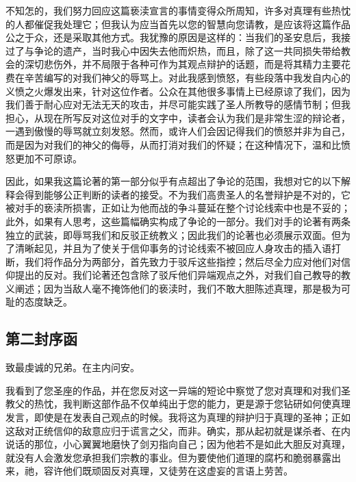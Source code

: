 不知怎的，我们努力回应这篇亵渎宣言的事情变得众所周知，许多对真理有些热忱的人都催促我处理它；但我认为应当首先以您的智慧向您请教，是应该将这篇作品公之于众，还是采取其他方式。我犹豫的原因是这样的：当我们的圣安息后，我接过了与争论的遗产，当时我心中因失去他而炽热，而且，除了这一共同损失带给教会的深切悲伤外，并不局限于各种可作为其观点辩护的话题，而是将其精力主要花费在辛苦编写的对我们神父的辱骂上。对此我感到愤怒，有些段落中我发自内心的义愤之火爆发出来，针对这位作者。公众在其他很多事情上已经原谅了我们，因为我们善于耐心应对无法无天的攻击，并尽可能实践了圣人所教导的感情节制；但我担心，从现在所写反对这位对手的文字中，读者会认为我们是非常生涩的辩论者，一遇到傲慢的辱骂就立刻发怒。然而，或许人们会因记得我们的愤怒并非为自己，而是因为对我们的神父的侮辱，从而打消对我们的怀疑；在这种情况下，温和比愤怒更加不可原谅。\par

因此，如果我这篇论著的第一部分似乎有点超出了争论的范围，我想对它的以下解释会得到能够公正判断的读者的接受。不为我们高贵圣人的名誉辩护是不对的，它被对手的亵渎所损害，正如让为他而战的争斗蔓延在整个讨论线索中也是不妥的；此外，如果有人思考，这些篇幅确实构成了争论的一部分。我们对手的论著有两条独立的武装，即辱骂我们和反驳正统教义；因此我们的论著也必须展示双面。但为了清晰起见，并且为了使关于信仰事务的讨论线索不被回应人身攻击的插入语打断，我们将作品分为两部分，首先致力于驳斥这些指控；然后尽全力应对他们对信仰提出的反对。我们论著还包含除了驳斥他们异端观点之外，对我们自己教导的教义阐述；因为当敌人毫不掩饰他们的亵渎时，我们不敢大胆陈述真理，那是极为可耻的态度缺乏。\par


\subsection{第二封序函}

致最虔诚的兄弟。在主内问安。\par

我看到了您圣座的作品，并在您反对这一异端的短论中察觉了您对真理和对我们圣教父的热忱，我判断这部作品不仅单纯出于您的能力，更是源于您钻研如何使真理发言，即使是在发表自己观点的时候。我将这为真理的辩护归于真理的圣神；正如这敌对正统信仰的敌意应归于谎言之父，而非。确实，那从起初就是谋杀者、在内说话的那位，小心翼翼地磨快了剑刃指向自己；因为他若不是如此大胆反对真理，就没有人会激发您承担我们宗教的事业。但为要使他们道理的腐朽和脆弱暴露出来，祂，容许他们既顽固反对真理，又徒劳在这虚妄的言语上劳苦。\par

